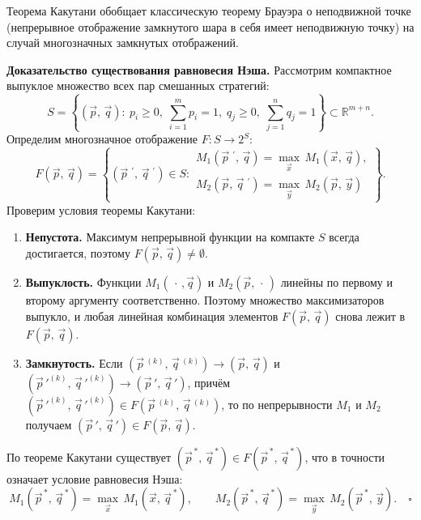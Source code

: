 \begin{Remark}{}{}
	Теорема Какутани обобщает классическую теорему Брауэра о неподвижной точке (непрерывное отображение замкнутого шара в себя имеет неподвижную точку) на случай многозначных замкнутых отображений.
\end{Remark}

\textbf{Доказательство существования равновесия Нэша.}
Рассмотрим компактное выпуклое множество всех пар смешанных стратегий:
\[
S = \left\{(\vec{p},\,\vec{q}) :\ p_i \geq 0,\; \sum_{i=1}^m p_i = 1,\; q_j \geq 0,\; \sum_{j=1}^n q_j = 1\right\} \subset \mathbb{R}^{m+n}.
\]
Определим многозначное отображение $F \colon S \to 2^S$:
\[
F(\vec{p},\,\vec{q}) = \left\{(\vec{p}{\,}^{\,\prime},\,\vec{q}{\,}^{\,\prime}) \in S :
\begin{array}{l}
	M_1(\vec{p}{\,}^{\,\prime},\,\vec{q}) = \max_{\vec{x}}\, M_1(\vec{x},\,\vec{q}), \\[2pt]
	M_2(\vec{p},\,\vec{q}{\,}^{\,\prime}) = \max_{\vec{y}}\, M_2(\vec{p},\,\vec{y})
\end{array}
\right\}.
\]
Проверим условия теоремы Какутани:
\begin{enumerate}
	\item \textbf{Непустота.} Максимум непрерывной функции на компакте $S$ всегда достигается, поэтому $F(\vec{p},\,\vec{q}) \neq \emptyset$.
	\item \textbf{Выпуклость.} Функции $M_1(\,\cdot\,,\vec{q})$ и $M_2(\vec{p},\,\cdot\,)$ линейны по первому и второму аргументу соответственно. Поэтому множество максимизаторов выпукло, и любая линейная комбинация элементов $F(\vec{p},\,\vec{q})$ снова лежит в $F(\vec{p},\,\vec{q})$.
	\item \textbf{Замкнутость.} Если $(\vec{p}{\,}^{(k)},\, \vec{q}{\,}^{(k)}) \to (\vec{p},\, \vec{q})$ и $(\vec{p}{\,}'^{(k)},\, \vec{q}{\,}'^{(k)}) \to (\vec{p}{\,}',\, \vec{q}{\,}')$, причём $(\vec{p}{\,}'^{(k)},\, \vec{q}{\,}'^{(k)}) \in F(\vec{p}{\,}^{(k)},\, \vec{q}{\,}^{(k)})$, то по непрерывности $M_1$ и $M_2$ получаем $(\vec{p}{\,}',\, \vec{q}{\,}') \in F(\vec{p},\, \vec{q})$.
\end{enumerate}
По теореме Какутани существует $(\vec{p}^{\,*},\,\vec{q}^{\,*}) \in F(\vec{p}^{\,*},\,\vec{q}^{\,*})$, что в точности означает условие равновесия Нэша:
\[
M_1(\vec{p}^{\,*},\,\vec{q}^{\,*}) = \max_{\vec{x}}\, M_1(\vec{x},\,\vec{q}^{\,*}), \qquad
M_2(\vec{p}^{\,*},\,\vec{q}^{\,*}) = \max_{\vec{y}}\, M_2(\vec{p}^{\,*},\,\vec{y}). \quad \square
\]